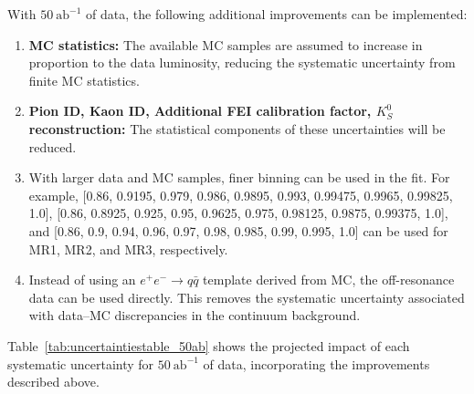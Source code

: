 With $50~\textrm{ab}^{-1}$ of data, the following additional improvements
can be implemented:
\begin{enumerate}
  \item \textbf{MC statistics:}
  The available MC samples are assumed to increase in proportion to the
  data luminosity, reducing the systematic uncertainty from finite MC
  statistics.

  \item \textbf{Pion ID, Kaon ID, Additional FEI calibration factor,
  $K_{S}^{0}$ reconstruction:}
  The statistical components of these uncertainties will be reduced.

  \item With larger data and MC samples, finer binning can be used in the
  fit.
  For example,
  [0.86, 0.9195, 0.979, 0.986, 0.9895, 0.993, 0.99475, 0.9965, 0.99825, 1.0],
  [0.86, 0.8925, 0.925, 0.95, 0.9625, 0.975, 0.98125, 0.9875, 0.99375, 1.0],
  and
  [0.86, 0.9, 0.94, 0.96, 0.97, 0.98, 0.985, 0.99, 0.995, 1.0]
  can be used for MR1, MR2, and MR3, respectively.

  \item Instead of using an $e^{+}e^{-}\rightarrow q\bar{q}$ template
  derived from MC, the off-resonance data can be used directly.
  This removes the systematic uncertainty associated with data--MC
  discrepancies in the continuum background.
\end{enumerate}

Table~\ref{tab:uncertaintiestable_50ab} shows the projected impact of each
systematic uncertainty for $50~\textrm{ab}^{-1}$ of data, incorporating
the improvements described above.

